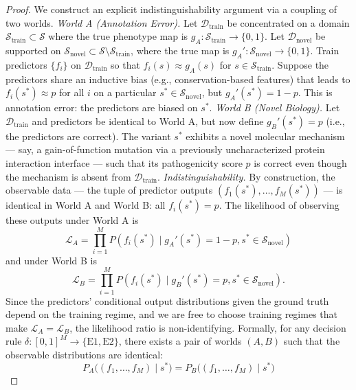 \documentclass[11pt,a4paper]{article}
\theoremstyle{definition}
\newcommand{\calD}{\mathcal{D}}
\newcommand{\calL}{\mathcal{L}}
\newcommand{\calS}{\mathcal{S}}
\begin{document}
\begin{proof}
We construct an explicit indistinguishability argument via a coupling of two worlds.
\medskip\noindent\textit{World A (Annotation Error).}
Let $\calD_{\text{train}}$ be concentrated on a domain $\calS_{\text{train}} \subset \calS$ where the true phenotype map is $g_A: \calS_{\text{train}} \to \{0,1\}$.
Let $\calD_{\text{novel}}$ be supported on $\calS_{\text{novel}} \subset \calS \setminus \calS_{\text{train}}$, where the true map is $g_A': \calS_{\text{novel}} \to \{0,1\}$.
Train predictors $\{f_i\}$ on $\calD_{\text{train}}$ so that $f_i(s) \approx g_A(s)$ for $s \in \calS_{\text{train}}$.
Suppose the predictors share an inductive bias (e.g., conservation-based features) that leads to $f_i(s^*) \approx p$ for all $i$ on a particular $s^* \in \calS_{\text{novel}}$, but $g_A'(s^*) = 1-p$.
This is annotation error: the predictors are biased on $s^*$.
\medskip\noindent\textit{World B (Novel Biology).}
Let $\calD_{\text{train}}$ and predictors be identical to World A, but now define $g_B'(s^*) = p$ (i.e., the predictors are correct).
The variant $s^*$ exhibits a novel molecular mechanism — say, a gain-of-function mutation via a previously uncharacterized protein interaction interface — such that its pathogenicity score $p$ is correct even though the mechanism is absent from $\calD_{\text{train}}$.
\medskip\noindent\textit{Indistinguishability.}
By construction, the observable data — the tuple of predictor outputs $(f_1(s^*), \dots, f_M(s^*))$ — is identical in World A and World B: all $f_i(s^*) = p$.
The likelihood of observing these outputs under World A is
\begin{equation}
    \calL_A = \prod_{i=1}^{M} P(f_i(s^*) \mid g_A'(s^*) = 1-p, s^* \in \calS_{\text{novel}})
\end{equation}
and under World B is
\begin{equation}
    \calL_B = \prod_{i=1}^{M} P(f_i(s^*) \mid g_B'(s^*) = p, s^* \in \calS_{\text{novel}}).
\end{equation}
Since the predictors' conditional output distributions given the ground truth depend on the training regime, and we are free to choose training regimes that make $\calL_A = \calL_B$, the likelihood ratio is non-identifying.
Formally, for any decision rule $\delta: [0,1]^M \to \{\text{E1}, \text{E2}\}$, there exists a pair of worlds $(A, B)$ such that the observable distributions are identical:
\begin{equation}
    P_A\big((f_1, \dots, f_M) \mid s^*\big) = P_B\big((f_1, \dots, f_M) \mid s^*\big)

\end{equation}
\end{proof}
\end{document}
